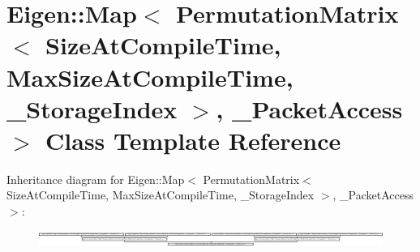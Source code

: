 \hypertarget{class_eigen_1_1_map_3_01_permutation_matrix_3_01_size_at_compile_time_00_01_max_size_at_compile_2f9d18bf0084dbfb13fbbfe14adaf22d}{}\section{Eigen\+:\+:Map$<$ Permutation\+Matrix$<$ Size\+At\+Compile\+Time, Max\+Size\+At\+Compile\+Time, \+\_\+\+Storage\+Index $>$, \+\_\+\+Packet\+Access $>$ Class Template Reference}
\label{class_eigen_1_1_map_3_01_permutation_matrix_3_01_size_at_compile_time_00_01_max_size_at_compile_2f9d18bf0084dbfb13fbbfe14adaf22d}
Inheritance diagram for Eigen\+:\+:Map$<$ Permutation\+Matrix$<$ Size\+At\+Compile\+Time, Max\+Size\+At\+Compile\+Time, \+\_\+\+Storage\+Index $>$, \+\_\+\+Packet\+Access $>$\+:\begin{figure}[H]
\begin{center}
\leavevmode
\includegraphics[height=0.536398cm]{class_eigen_1_1_map_3_01_permutation_matrix_3_01_size_at_compile_time_00_01_max_size_at_compile_2f9d18bf0084dbfb13fbbfe14adaf22d}
\end{center}
\end{figure}
